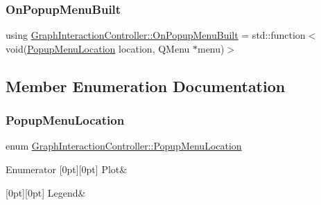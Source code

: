 \subsubsection{\texorpdfstring{OnPopupMenuBuilt}{OnPopupMenuBuilt}}
{\footnotesize\ttfamily using \mbox{\hyperlink{class_graph_interaction_controller_a9781ca3edf7c9c5cf3ad12c3496cf24c}{Graph\+Interaction\+Controller\+::\+On\+Popup\+Menu\+Built}} =  std\+::function$<$void(\mbox{\hyperlink{class_graph_interaction_controller_a67e6eba082927bf2b984bed54fe32764}{Popup\+Menu\+Location}} location, Q\+Menu $\ast$menu)$>$}



\subsection{Member Enumeration Documentation}
\mbox{\label{class_graph_interaction_controller_a67e6eba082927bf2b984bed54fe32764}} 
\subsubsection{\texorpdfstring{PopupMenuLocation}{PopupMenuLocation}}
{\footnotesize\ttfamily enum \mbox{\hyperlink{class_graph_interaction_controller_a67e6eba082927bf2b984bed54fe32764}{Graph\+Interaction\+Controller\+::\+Popup\+Menu\+Location}}\hspace{0.3cm}{\ttfamily [strong]}}

\begin{DoxyEnumFields}{Enumerator}
[0pt][0pt]{}\mbox{\label{class_graph_interaction_controller_a67e6eba082927bf2b984bed54fe32764a36be98b843e778a6e7350354b6937cfe}} 
Plot&\\
\hline

[0pt][0pt]{}\mbox{\label{class_graph_interaction_controller_a67e6eba082927bf2b984bed54fe32764a9b27e12d584b3438e811533b32e026e8}} 
Legend&\\
\hline

\end{DoxyEnumFields}


